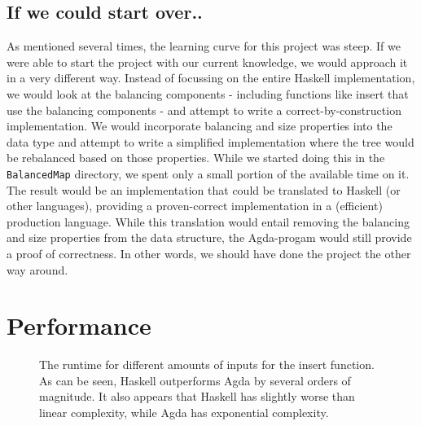 \documentclass[a4paper,UKenglish,cleveref, autoref, thm-restate]{template/lipics-v2021}
\begin{document}
\subsection{If we could start over..}
As mentioned several times, the learning curve for this project was steep. If we were able to start the project with our current knowledge, we would approach it in a very different way. Instead of focussing on the entire Haskell implementation, we would look at the balancing components - including functions like insert that use the balancing components - and attempt to write a correct-by-construction implementation. We would incorporate balancing and size properties into the data type and attempt to write a simplified implementation where the tree would be rebalanced based on those properties. While we started doing this in the \texttt{BalancedMap} directory, we spent only a small portion of the available time on it. The result would be an implementation that could be translated to Haskell (or other languages), providing a proven-correct implementation in a (efficient) production language. While this translation would entail removing the balancing and size properties from the data structure, the Agda-progam would still provide a proof of correctness. In other words, we should have done the project the other way around.


\section{Performance}


\begin{figure}[htbp]
  \centering
  \caption{The runtime for different amounts of inputs for the insert function. As can be seen, Haskell outperforms Agda by several orders of magnitude. It also appears that Haskell has slightly worse than linear complexity, while Agda has exponential complexity.}
  \label{benchmark}
\end{figure}
\end{document}
